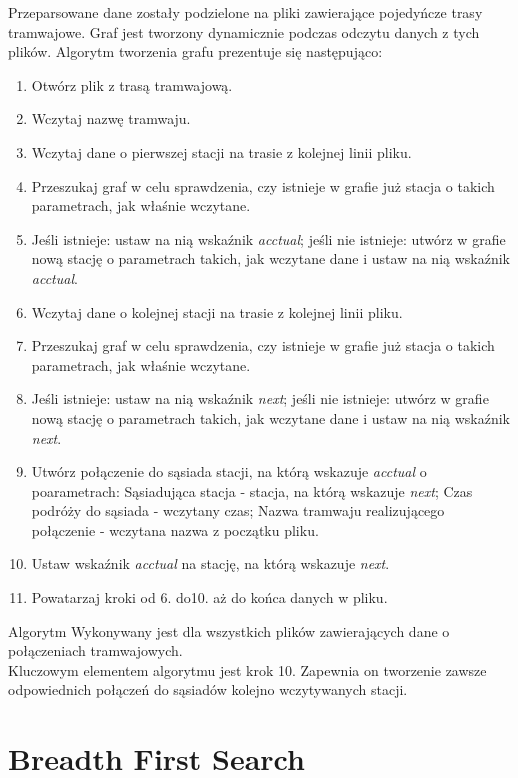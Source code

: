 \documentclass[13pt]{article}
\begin{document}
Przeparsowane dane zostały podzielone na pliki zawierające pojedyńcze trasy tramwajowe. Graf jest tworzony dynamicznie podczas odczytu danych z tych plików. Algorytm tworzenia grafu prezentuje się następująco:
\begin{enumerate}
\item{Otwórz plik z trasą tramwajową.}
\item{Wczytaj nazwę tramwaju.}
\item{Wczytaj dane o pierwszej stacji na trasie z kolejnej linii pliku.}
\item{Przeszukaj graf w celu sprawdzenia, czy istnieje w grafie już stacja o takich parametrach, jak właśnie wczytane.}
\item{Jeśli istnieje: ustaw na nią wskaźnik \textit{acctual}; jeśli nie istnieje: utwórz w grafie nową stację o parametrach takich, jak wczytane dane i ustaw na nią wskaźnik \textit{acctual}.}
\item{Wczytaj dane o kolejnej stacji na trasie z kolejnej linii pliku.}
\item{Przeszukaj graf w celu sprawdzenia, czy istnieje w grafie już stacja o takich parametrach, jak właśnie wczytane.}
\item{Jeśli istnieje: ustaw na nią wskaźnik \textit{next}; jeśli nie istnieje: utwórz w grafie nową stację o parametrach takich, jak wczytane dane i ustaw na nią wskaźnik \textit{next}.}
\item{Utwórz połączenie do sąsiada stacji, na którą wskazuje \textit{acctual} o poarametrach: Sąsiadująca stacja - stacja, na którą wskazuje \textit{next}; Czas podróży do sąsiada - wczytany czas; Nazwa tramwaju realizującego połączenie - wczytana nazwa z początku pliku.}
\item{Ustaw wskaźnik \textit{acctual} na stację, na którą wskazuje \textit{next}.}
\item{Powatarzaj kroki od 6. do10. aż do końca danych w pliku.}
\end{enumerate}
Algorytm Wykonywany jest dla wszystkich plików zawierających dane o połączeniach tramwajowych.\\
Kluczowym elementem algorytmu jest krok 10. Zapewnia on tworzenie zawsze odpowiednich połączeń do sąsiadów kolejno wczytywanych stacji.


\section{Breadth First Search}
\end{document}

